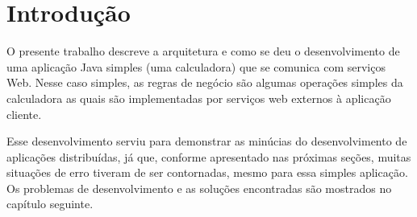 %


\chapter{Introdução}

O presente trabalho descreve a arquitetura e como se deu o desenvolvimento de
uma aplicação Java simples (uma calculadora) que se comunica com serviços Web.
Nesse caso simples, as regras de negócio são algumas operações simples
da calculadora as quais são implementadas por serviços web externos à aplicação
cliente.

Esse desenvolvimento serviu para demonstrar as minúcias do desenvolvimento de
aplicações distribuídas, já que, conforme apresentado nas próximas seções,
muitas situações de erro tiveram de ser contornadas, mesmo para essa simples
aplicação. Os problemas de desenvolvimento e as soluções encontradas são
mostrados no capítulo seguinte.
